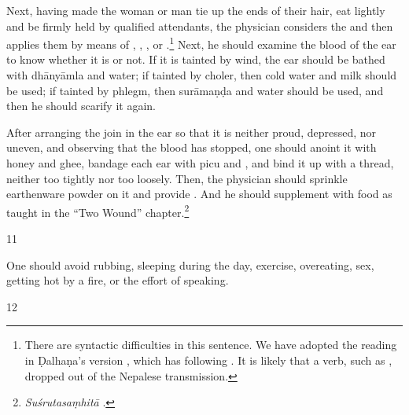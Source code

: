 \begin{translation}
Next, having made the woman or man tie up the ends of their hair, eat lightly
and be firmly held by qualified attendants, the physician considers the
 and then applies them by means of
, ,
, or
.\footnote{There are syntactic difficulties in
    this sentence.  We have %
    adopted the reading in Ḍalhaṇa's version \citep[78]{vulgate}, which has
     following . It is likely that a verb,
    such as , dropped out of the Nepalese transmission.}  Next, he
    should examine the blood of the ear to know whether it is
     or not. If it is tainted by wind, the ear
    should be bathed with \gls{dhānyāmla} and water; if tainted by choler,
    then cold water and milk should be used; if tainted by phlegm, then
    \gls{surāmaṇḍa} and water should be used, and then he should scarify it
    again.
       
After arranging the join in the ear so that it is neither proud, depressed, nor
uneven, and observing that the blood has stopped, one should anoint it with
honey and ghee, bandage each ear with \gls{picu} and 
, and
bind it up with a thread, neither too tightly nor too loosely.  Then, the
physician should sprinkle earthenware powder on it and  provide
. And he should supplement with food as taught in  the
“Two Wound” chapter.\footnote{\emph{Suśrutasaṃhitā} .}
    
    \smallskip
\item[11]
\begin{em}
        One should avoid rubbing, sleeping during the day, exercise, overeating,
        sex, getting hot by a fire, or the effort of speaking.
    \end{em}
\smallskip

\item[12]
    

\end{translation}
